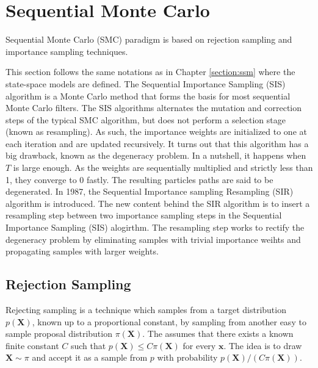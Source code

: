 \documentclass[11pt,a4,twosided,singlespacing,titlepagenumber=on]{scrreprt}
\numberwithin{equation}{chapter} %
\theoremstyle{remark}
\newcommand{\matr}[1]{\mathbf{#1}}
\begin{document}
\section{Sequential Monte Carlo}
\label{section:smc}
Sequential Monte Carlo (SMC) paradigm is based on rejection sampling and importance sampling techniques.

This section follows the same notations as in Chapter \ref{section:ssm} where the state-space models are defined. The Sequential Importance Sampling (SIS) algorithm is a Monte Carlo method that forms the basis for most sequential Monte Carlo filters. The SIS algorithms alternates the mutation and correction steps of the typical SMC algorithm, but does not perform a selection stage (known as resampling). As such, the importance weights are initialized to one at each iteration and are updated recursively. It turns out that this algorithm has a big drawback, known as the degeneracy problem. In a nutshell, it happens when $T$ is large enough. As the weights are sequentially multiplied and strictly less than 1, they converge to 0 fastly. The resulting particles paths are said to be degenerated. In 1987, the Sequential Importance sampling Resampling (SIR) algorithm is introduced. The new content behind the SIR algorithm is to insert a resampling step between two importance sampling steps in the Sequential Importance Sampling (SIS) alogirthm. The resampling step works to rectify the degeneracy problem by eliminating samples with trivial importance weihts and propagating samples with larger weights.

\subsection{Rejection Sampling}
Rejecting sampling is a technique which samples from a target distribution $p(\matr{X})$, known up to a proportional constant, by sampling from another easy to sample proposal distribution $\pi(\matr{X})$. The assumes that there exists a known finite constant $C$ such that $p(\matr{X}) \leq C \pi(\matr{X})$ for every $\matr{x}$. The idea is to draw $\matr{X} \sim \pi$ and accept it as a sample from $p$ with probability $p(\matr{X}) / ( C \pi(\matr{X}))$.
\end{document}
